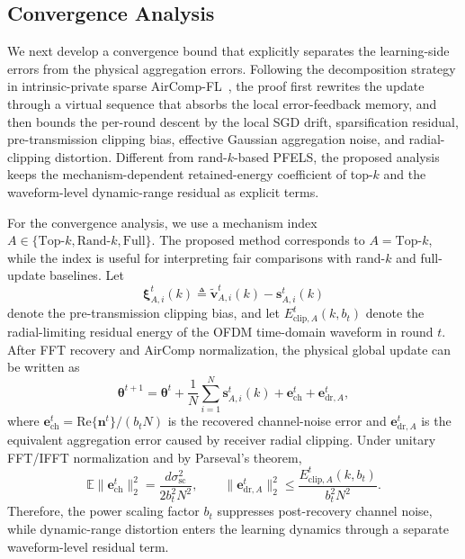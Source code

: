 \documentclass[journal]{IEEEtran}
\newenvironment{revisionblock}{\begingroup\color{revisionred}}{\endgroup}
\begin{document}
\begin{revisionblock}
\subsection{Convergence Analysis}

We next develop a convergence bound that explicitly separates the learning-side errors from the physical aggregation errors. Following the decomposition strategy in intrinsic-private sparse AirComp-FL~\cite{zhang2023communication}, the proof first rewrites the update through a virtual sequence that absorbs the local error-feedback memory, and then bounds the per-round descent by the local SGD drift, sparsification residual, pre-transmission clipping bias, effective Gaussian aggregation noise, and radial-clipping distortion. Different from rand-$k$-based PFELS, the proposed analysis keeps the mechanism-dependent retained-energy coefficient of top-$k$ and the waveform-level dynamic-range residual as explicit terms.

For the convergence analysis, we use a mechanism index $A\in\{\mathrm{Top}\text{-}k,\mathrm{Rand}\text{-}k,\mathrm{Full}\}$. The proposed method corresponds to $A=\mathrm{Top}\text{-}k$, while the index is useful for interpreting fair comparisons with rand-$k$ and full-update baselines. Let
{
\begin{equation}
    \boldsymbol{\xi}_{A,i}^t(k)\triangleq \tilde{\mathbf{v}}_{A,i}^t(k)-\mathbf{s}_{A,i}^t(k)
\end{equation}
}
denote the pre-transmission clipping bias, and let $E_{\mathrm{clip},A}^t(k,b_t)$ denote the radial-limiting residual energy of the OFDM time-domain waveform in round $t$. After FFT recovery and AirComp normalization, the physical global update can be written as
{
\begin{equation}
    \boldsymbol{\theta}^{t+1}
    =
    \boldsymbol{\theta}^{t}
    +\frac{1}{N}\sum_{i=1}^{N}\mathbf{s}_{A,i}^t(k)
    +\mathbf{e}_{\mathrm{ch}}^t
    +\mathbf{e}_{\mathrm{dr},A}^t,
    \label{eqn:physical_update}
\end{equation}
}
where $\mathbf{e}_{\mathrm{ch}}^t=\mathrm{Re}\{\mathbf{n}^t\}/(b_tN)$ is the recovered channel-noise error and $\mathbf{e}_{\mathrm{dr},A}^t$ is the equivalent aggregation error caused by receiver radial clipping. Under unitary FFT/IFFT normalization and by Parseval's theorem,
{
\begin{equation}
    \mathbb{E}\|\mathbf{e}_{\mathrm{ch}}^t\|_2^2
    =
    \frac{d\sigma_{\mathrm{sc}}^2}{2b_t^2N^2},
    \qquad
    \|\mathbf{e}_{\mathrm{dr},A}^t\|_2^2
    \le
    \frac{E_{\mathrm{clip},A}^t(k,b_t)}{b_t^2N^2}.
    \label{eqn:physical_errors}
\end{equation}
}
Therefore, the power scaling factor $b_t$ suppresses post-recovery channel noise, while dynamic-range distortion enters the learning dynamics through a separate waveform-level residual term.


\end{revisionblock}
\end{document}
